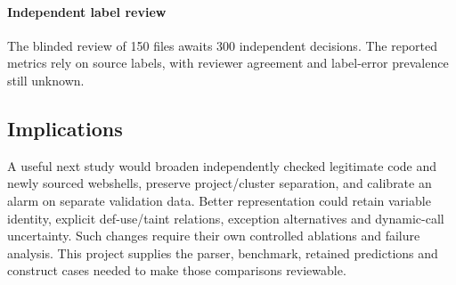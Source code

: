 \paragraph{Independent label review}
The blinded review of 150 files awaits 300 independent decisions. The reported metrics rely on source
labels, with reviewer agreement and label-error prevalence still unknown.

\subsection{Implications}
A useful next study would broaden independently checked legitimate code and newly sourced webshells, preserve
project/cluster separation, and calibrate an alarm on separate validation data. Better representation could retain
variable identity, explicit def-use/taint relations, exception alternatives and dynamic-call uncertainty.
Such changes require their own controlled ablations and failure analysis. This project supplies the parser,
benchmark, retained predictions and construct cases needed to make those comparisons reviewable.
